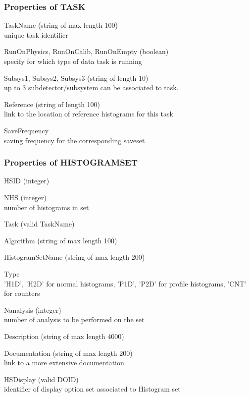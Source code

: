 \documentclass{lhcbnote}
\begin{document}
\subsubsection{Properties of TASK} 
\begin{description}
\item{TaskName} (string of max length 100) \\
unique task identifier
\item{RunOnPhysics, RunOnCalib, RunOnEmpty} (boolean)\\
specify for which type of data task is running 
\item{Subsys1, Subsys2, Subsys3} (string of length 10)\\
up to 3 subdetector/subsystem can be associated to task. 
\item{Reference}  (string of length 100)\\
link to the location of reference histograms for this task
\item{SaveFrequency} \\ saving frequency for the corresponding saveset
\end{description} 

\subsubsection{Properties of HISTOGRAMSET}
\begin{description}
\item{HSID} (integer)
\item{NHS} (integer)\\
number of histograms in set
\item{Task} (valid TaskName) 
\item{Algorithm} (string of max length 100) 
\item{HistogramSetName} (string of max length 200) 
\item{Type} \\
'H1D', 'H2D' for normal histograms, 'P1D', 'P2D' for profile
histograms, 'CNT' for counters
\item{Nanalysis} (integer)\\
number of analysis to be performed on the set
\item{Description} (string of max length 4000) 
\item{Documentation} (string of max length 200)\\
link to a more extensive documentation
\item{HSDisplay} (valid DOID)\\
identifier of display option set associated to Histogram set 
\end{description}
\end{document}
